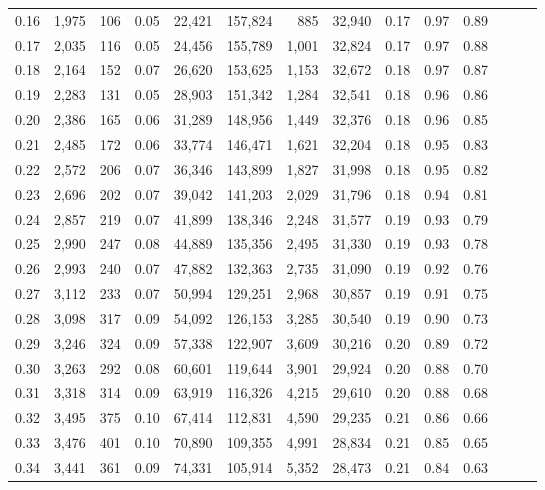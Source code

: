 \begin{tabular}{rrrrrrrrrrrrrr}
0.16 &  1,975 &  106 &  0.05 &   22,421 &  157,824 &     885 &  32,940 &  0.17 &  0.97 &      0.89 \\
0.17 &  2,035 &  116 &  0.05 &   24,456 &  155,789 &   1,001 &  32,824 &  0.17 &  0.97 &      0.88 \\
0.18 &  2,164 &  152 &  0.07 &   26,620 &  153,625 &   1,153 &  32,672 &  0.18 &  0.97 &      0.87 \\
0.19 &  2,283 &  131 &  0.05 &   28,903 &  151,342 &   1,284 &  32,541 &  0.18 &  0.96 &      0.86 \\
0.20 &  2,386 &  165 &  0.06 &   31,289 &  148,956 &   1,449 &  32,376 &  0.18 &  0.96 &      0.85 \\
0.21 &  2,485 &  172 &  0.06 &   33,774 &  146,471 &   1,621 &  32,204 &  0.18 &  0.95 &      0.83 \\
0.22 &  2,572 &  206 &  0.07 &   36,346 &  143,899 &   1,827 &  31,998 &  0.18 &  0.95 &      0.82 \\
0.23 &  2,696 &  202 &  0.07 &   39,042 &  141,203 &   2,029 &  31,796 &  0.18 &  0.94 &      0.81 \\
0.24 &  2,857 &  219 &  0.07 &   41,899 &  138,346 &   2,248 &  31,577 &  0.19 &  0.93 &      0.79 \\
0.25 &  2,990 &  247 &  0.08 &   44,889 &  135,356 &   2,495 &  31,330 &  0.19 &  0.93 &      0.78 \\
0.26 &  2,993 &  240 &  0.07 &   47,882 &  132,363 &   2,735 &  31,090 &  0.19 &  0.92 &      0.76 \\
0.27 &  3,112 &  233 &  0.07 &   50,994 &  129,251 &   2,968 &  30,857 &  0.19 &  0.91 &      0.75 \\
0.28 &  3,098 &  317 &  0.09 &   54,092 &  126,153 &   3,285 &  30,540 &  0.19 &  0.90 &      0.73 \\
0.29 &  3,246 &  324 &  0.09 &   57,338 &  122,907 &   3,609 &  30,216 &  0.20 &  0.89 &      0.72 \\
0.30 &  3,263 &  292 &  0.08 &   60,601 &  119,644 &   3,901 &  29,924 &  0.20 &  0.88 &      0.70 \\
0.31 &  3,318 &  314 &  0.09 &   63,919 &  116,326 &   4,215 &  29,610 &  0.20 &  0.88 &      0.68 \\
0.32 &  3,495 &  375 &  0.10 &   67,414 &  112,831 &   4,590 &  29,235 &  0.21 &  0.86 &      0.66 \\
0.33 &  3,476 &  401 &  0.10 &   70,890 &  109,355 &   4,991 &  28,834 &  0.21 &  0.85 &      0.65 \\
0.34 &  3,441 &  361 &  0.09 &   74,331 &  105,914 &   5,352 &  28,473 &  0.21 &  0.84 &      0.63 \\

\end{tabular}
